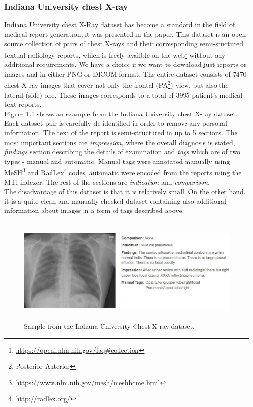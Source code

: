 \subsubsection{Indiana University chest X-ray}
\label{sec:IUDataset}
Indiana University chest X-Ray dataset has become a standard in the field of medical report generation, it was presented in the \citet{10.1093/jamia/ocv080} paper. This dataset is an open source collection of pairs of chest X-rays and their corresponding semi-stuctured textual radiology reports, which is freely availble on the web\footnote[4]{\url{https://openi.nlm.nih.gov/faq\#collection}} without any additional requirements. We have a choice if we want to download just reports or images and in either PNG or DICOM format. The entire dataset consists of 7470 chest X-ray images that cover not only the frontal (PA\footnote[5]{Posterior-Anterior}) view, but also the lateral (side) one. These images corresponds to a total of 3995 patient's medical text reports.\\

Figure \hyperref[fig01:IUChestXRaySample]{1.1} shows an example from the Indiana University chest X-ray dataset. Each dataset pair is carefully de-identified in order to remove any personal information. The text of the report is semi-structured in up to 5 sections. The most important sections are \textit{impression}, where the overall diagnosis is stated, \textit{findings} section describing the details of examination and \textit{tags} which are of two types - manual and automatic. Manual tags were annotated manually using MeSH\footnote[6]{\url{https://www.nlm.nih.gov/mesh/meshhome.html}} and RadLex\footnote[7]{\url{http://radlex.org/}} codes, automatic were encoded from the reports using the MTI indexer. The rest of the sections are \textit{indication} and \textit{comparison}.\\

The disadvantage of this dataset is that it is relatively small. On the other hand, it is a quite clean and manually checked dataset containing also additional information about images in a form of tags described above.

\begin{figure}[h]\centering
\includegraphics[width=145mm, height=53mm]{../img/IUChestXRaySample_CXR1728_IM-0479-1001}
\caption{Sample from the Indiana University Chest X-ray dataset.}
\label{fig01:IUChestXRaySample}
\end{figure}

